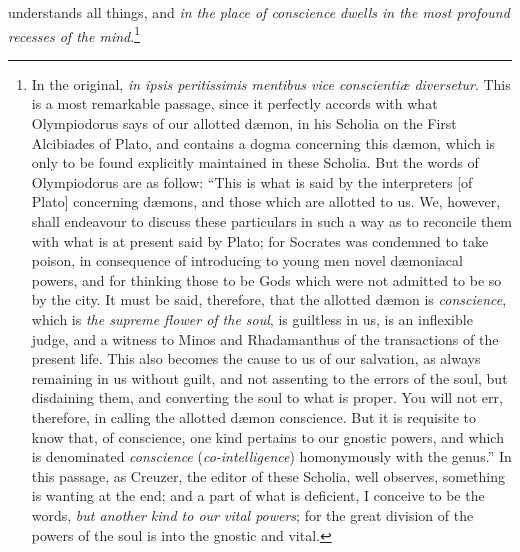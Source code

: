 \documentclass{article}
\begin{document}
understands all things, and \textit{in the place of conscience dwells in the
most profound recesses of the mind}.\footnote{In the original, \textit{in ipsis
peritissimis mentibus vice conscienti{\ae} diversetur}. This is a most
remarkable passage, since it perfectly accords with what Olympiodorus says of
our allotted d{\ae}mon, in his Scholia on the First Alcibiades of
Plato, and contains a dogma concerning this d{\ae}mon, which is only to be
found explicitly maintained in these Scholia. But the words of
Olympiodorus are as follow: ``This is what is said by the interpreters [of
Plato] concerning d{\ae}mons, and those which are allotted to us. We, however,
shall endeavour to discuss these particulars in such a way as to reconcile them
with what is at present said by Plato; for Socrates was condemned to take
poison, in consequence of introducing to young men novel d{\ae}moniacal powers,
and for thinking those to be Gods which were not admitted to be so by the city.
It must be said, therefore, that the allotted d{\ae}mon is \textit{conscience},
which is \textit{the supreme flower of the soul}, is guiltless in us, is an
inflexible judge, and a witness to Minos and Rhadamanthus of the transactions
of the present life. This also becomes the cause to us of our salvation, as
always remaining in us without guilt, and not assenting to the errors of the
soul, but disdaining them, and converting the soul to what is proper. You will
not err, therefore, in calling the allotted d{\ae}mon conscience. But it is
requisite to know that, of conscience, one kind pertains to our gnostic powers,
and which is denominated \textit{conscience} (\textit{co-intelligence})
homonymously with the genus.'' In this passage, as Creuzer, the editor of these
Scholia, well observes, something is wanting at the end; and a part of
what is deficient, I conceive to be the words, \textit{but another kind to our
vital powers}; for the great division of the powers of the soul is into the
gnostic and vital.

}
\end{document}
